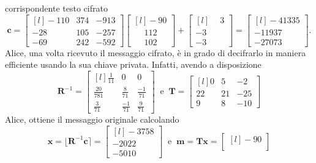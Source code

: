 \begin{exmp}
corrispondente testo cifrato
\begin{equation*}
    \mathbf{c} =
    \begin{bmatrix*}[l]
        -110 & 374 & -913\\
        -28  & 105 & -257\\
        -69  & 242 & -592
    \end{bmatrix*}
    \begin{bmatrix*}[l]
              -90 \\
    \phantom{-}112\\
    \phantom{-}102
    \end{bmatrix*}
    +
    \begin{bmatrix*}[l]
    \phantom{-}3\\
              -3\\
              -3
    \end{bmatrix*}
    =
    \begin{bmatrix*}[l]
        -41335\\
        -11937\\
        -27073
    \end{bmatrix*}.
\end{equation*}
Alice, una volta ricevuto il messaggio cifrato, è in grado di decifrarlo in maniera efficiente
usando la sua chiave privata. Infatti, avendo a disposizione
\[
    \mathbf{R}^{-1} = 
    \begin{bmatrix*}[l]
        \frac{1}{11}    & 0             & 0\\[6pt]
        \frac{20}{781}  & \frac{8}{71}  & \frac{-1}{71}\\[6pt]
        \frac{3}{71}    & \frac{-1}{71} & \frac{9}{71}
    \end{bmatrix*}
    \ \text{ e } \ 
    \mathbf{T} =
    \begin{bmatrix*}[l]
        0  & 5  & -2 \\
        22 & 21 & -25 \\
        9  & 8  & -10
    \end{bmatrix*}
\]
Alice, ottiene il messaggio originale calcolando 
\[
    \mathbf{x} = \lfloor \mathbf{R}^{-1}\mathbf{c}\rceil = 
    \begin{bmatrix*}[l]
        -3758 \\
        -2022 \\
        -5010 
    \end{bmatrix*}
    \ \text{ e } \ \mathbf{m} = \mathbf{T}\mathbf{x} = 
    \begin{bmatrix*}[l]
        -90 \\

\end{bmatrix*}\]
\end{exmp}
